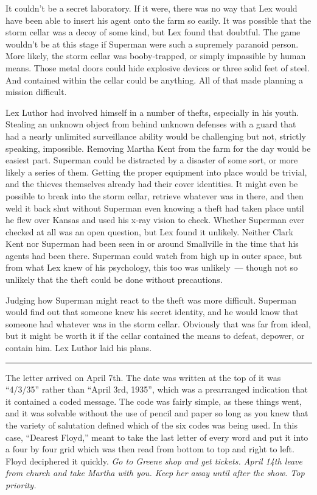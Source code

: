 \documentclass[ebook,12pt]{memoir}
\begin{document}
It couldn't be a secret laboratory. If it were, there was no way that
Lex would have been able to insert his agent onto the farm so easily. It
was possible that the storm cellar was a decoy of some kind, but Lex
found that doubtful. The game wouldn't be at this stage if Superman were
such a supremely paranoid person. More likely, the storm cellar was
booby‐trapped, or simply impassible by human means. Those metal doors
could hide explosive devices or three solid feet of steel. And contained
within the cellar could be anything. All of that made planning a mission
difficult.

Lex Luthor had involved himself in a number of thefts, especially in his
youth. Stealing an unknown object from behind unknown defenses with a
guard that had a nearly unlimited surveillance ability would be
challenging but not, strictly speaking, impossible. Removing Martha Kent
from the farm for the day would be easiest part. Superman could be
distracted by a disaster of some sort, or more likely a series of them.
Getting the proper equipment into place would be trivial, and the
thieves themselves already had their cover identities. It might even be
possible to break into the storm cellar, retrieve whatever was in there,
and then weld it back shut without Superman even knowing a theft had
taken place until he flew over Kansas and used his x‐ray vision to
check. Whether Superman ever checked at all was an open question, but
Lex found it unlikely. Neither Clark Kent nor Superman had been seen in
or around Smallville in the time that his agents had been there.
Superman could watch from high up in outer space, but from what Lex knew
of his psychology, this too was unlikely~--- though not so unlikely that
the theft could be done without precautions.

Judging how Superman might react to the theft was more difficult.
Superman would find out that someone knew his secret identity, and he
would know that someone had whatever was in the storm cellar. Obviously
that was far from ideal, but it might be worth it if the cellar
contained the means to defeat, depower, or contain him. Lex Luthor laid
his plans.

\begin{center}\rule{0.5\linewidth}{\linethickness}\end{center}

The letter arrived on April 7th. The date was written at the top of it
was ``4/3/35'' rather than ``April 3rd, 1935'', which was a prearranged
indication that it contained a coded message. The code was fairly
simple, as these things went, and it was solvable without the use of
pencil and paper so long as you knew that the variety of salutation
defined which of the six codes was being used. In this case, ``Dearest
Floyd,'' meant to take the last letter of every word and put it into a
four by four grid which was then read from bottom to top and right to
left. Floyd deciphered it quickly. \emph{Go to Greene shop and get
tickets. April 14th leave from church and take Martha with you. Keep her
away until after the show. Top priority.}
\end{document}
